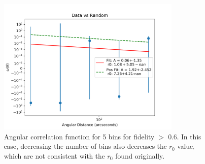 \begin{figure}[!tbp]
\centering \includegraphics[width=90mm]{clustering_two/Data_vs_Random_10000_bin5_sn0_6_NFalse.png}
\caption{Angular correlation function for 5 bins for fidelity $>$ 0.6. In this case, decreasing the number of bins also decreases the $r_0$ value, which are not consistent with the $r_0$ found originally.}
\label{fig:Angular_bin_5}
\end{figure}

